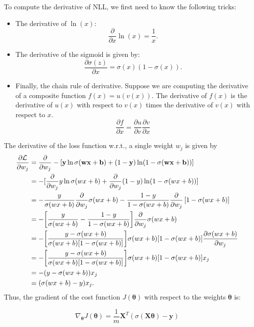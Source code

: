 To compute the derivative of NLL, we first need to know the following tricks:
\begin{itemize}
	\item The derivative of $\ln (x)$:
$$\frac{\partial }{\partial x}\ln (x) = \frac{1}{x}.$$
\item The derivative of the sigmoid is given by:
$$\frac{\partial \sigma(z)}{\partial x} = \sigma(x)(1-\sigma(x)).$$
\item Finally, the chain rule of derivative. Suppose we are computing the derivative of a composite function $f(x) = u(v(x))$. The derivative of $f(x)$ is the derivative of $u(x)$ with respect to $v(x)$ times the derivative of $v(x)$ with respect to $x$.
$$\frac{\partial f}{\partial x} = \frac{\partial u}{\partial v} \frac{\partial v}{\partial x}$$
\end{itemize}
The derivative of the loss function w.r.t., a single weight $w_j$ is given by
\begin{align*}
	\frac{\partial \mathcal{L}}{\partial w_j} &= \frac{\partial }{\partial w_j} -[{\mathbf{y}}\ln \sigma({\mathbf{w}}{\mathbf{x}} + {\mathbf{b}})+(1-{\mathbf{y}}) \ln (1-\sigma({\mathbf{w}}{\mathbf{x}}+{\mathbf{b}}))]\\
											  &=  -[\frac{\partial }{\partial w_j}y\ln \sigma(wx + b)+\frac{\partial }{\partial w_j}(1-y) \ln (1-\sigma(wx+b))]\\
											  &= -\frac{y}{\sigma(wx + b)}\frac{\partial }{\partial w_j}\sigma(wx + b) - \frac{1-y}{1-\sigma(wx+b)} \frac{\partial }{\partial w_j}\left[1-\sigma(wx+b)\right]\\
											  &= -\bigg[\frac{y}{\sigma(wx + b)}-\frac{1-y}{1-\sigma(wx + b)}\bigg]\frac{\partial }{\partial w_j}\sigma(wx + b)\\
											  &= -\bigg[\frac{y-\sigma(wx + b)}{\sigma(wx + b)[1-\sigma(wx + b)]}\bigg]\sigma(wx + b)[1-\sigma(wx + b)]\frac{\partial \sigma(wx + b)}{\partial w_j}\\
											  &= -\bigg[\frac{y-\sigma(wx + b)}{\sigma(wx + b)[1-\sigma(wx + b)]}\bigg]\sigma(wx + b)[1-\sigma(wx + b)]x_j\\ 
											  &= -( y-\sigma(wx + b) )x_j\\
											  &= ( \sigma(wx + b)-y )x_j.
\end{align*}
Thus, the gradient of the cost function $J(\boldsymbol{\theta})$ with respect to the weights $\boldsymbol{\theta}$ is:

\[
\nabla_{\boldsymbol{\theta}} J(\boldsymbol{\theta}) = \frac{1}{m} \mathbf{X}^T (\sigma(\mathbf{X} \boldsymbol{\theta}) - \mathbf{y})
\]

